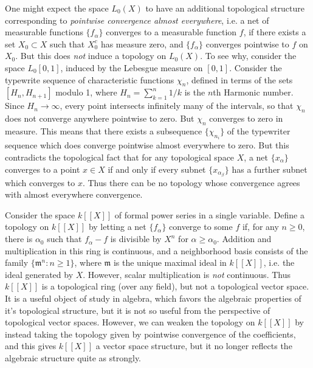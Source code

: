 \begin{example}
    One might expect the space $L_0(X)$ to have an additional topological structure corresponding to \emph{pointwise convergence almost everywhere}, i.e. a net of measurable functions $\{ f_\alpha \}$ converges to a measurable function $f$, if there exists a set $X_0 \subset X$ such that $X_0^c$ has measure zero, and $\{ f_\alpha \}$ converges pointwise to $f$ on $X_0$. But this does \emph{not} induce a topology on $L_0(X)$. To see why, consider the space $L_0[0,1]$, induced by the Lebesgue measure on $[0,1]$. Consider the typewrite sequence of characteristic functions $\chi_n$, defined in terms of the sets $[H_n, H_{n+1}]$ modulo 1, where $H_n = \sum_{k = 1}^n 1/k$ is the $n$th Harmonic number. Since $H_n \to \infty$, every point intersects infinitely many of the intervals, so that $\chi_n$ does not converge anywhere pointwise to zero. But $\chi_n$ converges to zero in measure. This means that there exists a subsequence $\{ \chi_{n_i} \}$ of the typewriter sequence which does converge pointwise almost everywhere to zero. But this contradicts the topological fact that for any topological space $X$, a net $\{ x_\alpha \}$ converges to a point $x \in X$ if and only if every subnet $\{ x_{\alpha_\beta} \}$ has a further subnet which converges to $x$. Thus there can be no topology whose convergence agrees with almost everywhere convergence.
\end{example}

\begin{example}
    Consider the space $k[[X]]$ of formal power series in a single variable. Define a topology on $k[[X]]$ by letting a net $\{ f_\alpha \}$ converge to some $f$ if, for any $n \geq 0$, there is $\alpha_0$ such that $f_\alpha - f$ is divisible by $X^n$ for $\alpha \geq \alpha_0$. Addition and multiplication in this ring is continuous, and a neighborhood basis consists of the family $\{ \mathfrak{m}^n: n \geq 1 \}$, where $\mathfrak{m}$ is the unique maximal ideal in $k[[X]]$, i.e. the ideal generated by $X$. However, scalar multiplication is \emph{not} continuous. Thus $k[[X]]$ is a topological ring (over any field), but not a topological vector space. It is a useful object of study in algebra, which favors the algebraic properties of it's topological structure, but it is not so useful from the perspective of topological vector spaces. However, we can weaken the topology on $k[[X]]$ by instead taking the topology given by pointwise convergence of the coefficients, and this gives $k[[X]]$ a vector space structure, but it no longer reflects the algebraic structure quite as strongly.
\end{example}

